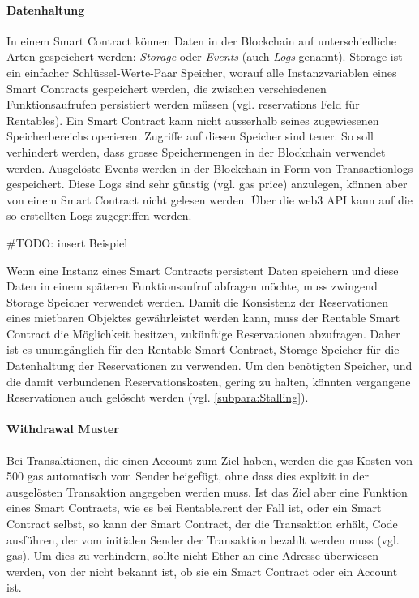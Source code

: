 \paragraph{Datenhaltung}
In einem Smart Contract können Daten in der Blockchain auf unterschiedliche Arten gespeichert werden: \emph{Storage} oder \emph{Events} (auch \emph{Logs} genannt). Storage ist ein einfacher Schlüssel-Werte-Paar Speicher, worauf alle Instanzvariablen eines Smart Contracts gespeichert werden, die zwischen verschiedenen Funktionsaufrufen persistiert werden müssen (vgl. reservations Feld für Rentables). Ein Smart Contract kann nicht ausserhalb seines zugewiesenen Speicherbereichs operieren. Zugriffe auf diesen Speicher sind teuer. So soll verhindert werden, dass grosse Speichermengen in der Blockchain verwendet werden. Ausgelöste Events werden in der Blockchain in Form von Transactionlogs gespeichert. Diese Logs sind sehr günstig (vgl. gas price) anzulegen, können aber von einem Smart Contract nicht gelesen werden. Über die web3 API kann auf die so erstellten Logs zugegriffen werden.\cite[Miscellaneous/Introduction to Smart Contracts]{solidity.readthedocs.io}\cite{jonathanpatrick.me/ethereum}

\#TODO: insert Beispiel

Wenn eine Instanz eines Smart Contracts persistent Daten speichern und diese Daten in einem späteren Funktionsaufruf abfragen möchte, muss zwingend Storage Speicher verwendet werden. Damit die Konsistenz der Reservationen eines mietbaren Objektes gewährleistet werden kann, muss der Rentable Smart Contract die Möglichkeit besitzen, zukünftige Reservationen abzufragen. Daher ist es unumgänglich für den Rentable Smart Contract, Storage Speicher für die Datenhaltung der Reservationen zu verwenden. Um den benötigten Speicher, und die damit verbundenen Reservationskosten, gering zu halten, könnten vergangene Reservationen auch gelöscht werden (vgl. \ref{subpara:Stalling}).

\paragraph{Withdrawal Muster}
\label{para:Withdrawal_Muster}
Bei Transaktionen, die einen Account zum Ziel haben, werden die gas-Kosten von 500 gas automatisch vom Sender beigefügt, ohne dass dies explizit in der ausgelösten Transaktion angegeben werden muss. Ist das Ziel aber eine Funktion eines Smart Contracts, wie es bei Rentable.rent der Fall ist, oder ein Smart Contract selbst, so kann der Smart Contract, der die Transaktion erhält, Code ausführen, der vom initialen Sender der Transaktion bezahlt werden muss (vgl. gas). Um dies zu verhindern, sollte nicht Ether an eine Adresse überwiesen werden, von der nicht bekannt ist, ob sie ein Smart Contract oder ein Account ist.\cite[Wiki/Contracts and Transactions]{go-ethereum}\cite{cryptocompare.com/gas}\cite[FAQ/What is the deal with...]{solidity.readthedocs.io}

